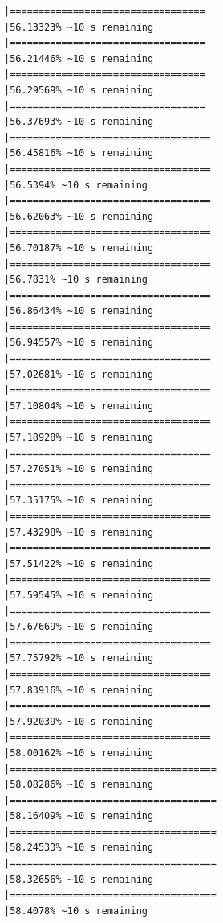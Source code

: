 \documentclass{article}\usepackage[]{graphicx}\usepackage[]{xcolor}
\makeatletter
\newenvironment{kframe}{%
 \def\at@end@of@kframe{}%
 \ifinner\ifhmode%
  \def\at@end@of@kframe{\end{minipage}}%
  \begin{minipage}{\columnwidth}%
 \fi\fi%
 \def\FrameCommand##1{\hskip\@totalleftmargin \hskip-\fboxsep
 \colorbox{shadecolor}{##1}\hskip-\fboxsep
     \hskip-\linewidth \hskip-\@totalleftmargin \hskip\columnwidth}%
 \MakeFramed {\advance\hsize-\width
   \@totalleftmargin\z@ \linewidth\hsize
   \@setminipage}}%
 {\par\unskip\endMakeFramed%
 \at@end@of@kframe}
\newenvironment{knitrout}{}{} %
\makeatother
\begin{document}
\begin{knitrout}
\begin{kframe}
\begin{verbatim}
|==================================                            |56.13323% ~10 s remaining 
|==================================                            |56.21446% ~10 s remaining 
|==================================                            |56.29569% ~10 s remaining 
|==================================                            |56.37693% ~10 s remaining 
|===================================                           |56.45816% ~10 s remaining 
|===================================                           |56.5394% ~10 s remaining  
|===================================                           |56.62063% ~10 s remaining 
|===================================                           |56.70187% ~10 s remaining 
|===================================                           |56.7831% ~10 s remaining  
|===================================                           |56.86434% ~10 s remaining 
|===================================                           |56.94557% ~10 s remaining 
|===================================                           |57.02681% ~10 s remaining 
|===================================                           |57.10804% ~10 s remaining 
|===================================                           |57.18928% ~10 s remaining 
|===================================                           |57.27051% ~10 s remaining 
|===================================                           |57.35175% ~10 s remaining 
|===================================                           |57.43298% ~10 s remaining 
|===================================                           |57.51422% ~10 s remaining 
|===================================                           |57.59545% ~10 s remaining 
|===================================                           |57.67669% ~10 s remaining 
|===================================                           |57.75792% ~10 s remaining 
|===================================                           |57.83916% ~10 s remaining 
|===================================                           |57.92039% ~10 s remaining 
|===================================                           |58.00162% ~10 s remaining 
|====================================                          |58.08286% ~10 s remaining 
|====================================                          |58.16409% ~10 s remaining 
|====================================                          |58.24533% ~10 s remaining 
|====================================                          |58.32656% ~10 s remaining 
|====================================                          |58.4078% ~10 s remaining  

\end{verbatim}
\end{kframe}
\end{knitrout}
\end{document}
